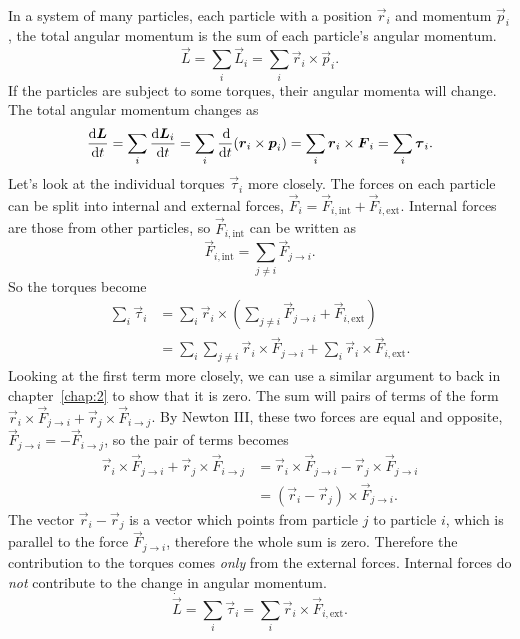 \documentclass[../classical_mechanics.tex]{subfiles}
\begin{document}
        \paragraph{}
        In a system of many particles, each particle with a position $\vec{r}_i$ and momentum $\vec{p}_i$, the total angular momentum is the sum of each particle's angular momentum.
        \begin{equation}
            \vec{L}=\sum_i\vec{L}_i=\sum_i\vec{r}_i\times\vec{p}_i.
        \end{equation}
        If the particles are subject to some torques, their angular momenta will change.
        The total angular momentum changes as
        \begin{equation}
            \dv{\vec{L}}{t}=\sum_i\dv{\vec{L}_i}{t}=\sum_i\dv{}{t}(\vec{r}_i\times\vec{p}_i)=\sum_i\vec{r}_i\times\vec{F}_i=\sum_i\vec{\tau}_i.
        \end{equation}
        Let's look at the individual torques $\vec{\tau}_i$ more closely.
        The forces on each particle can be split into internal and external forces, $\vec{F}_i=\vec{F}_{i,\text{int}}+\vec{F}_{i,\text{ext}}$.
        Internal forces are those from other particles, so $\vec{F}_{i,\text{int}}$ can be written as
        \begin{equation}
            \vec{F}_{i,\text{int}}=\sum_{j\neq i}\vec{F}_{j\to i}.
        \end{equation}
        So the torques become
        \begin{align}
            \sum_i\vec{\tau}_i&=\sum_i\vec{r}_i\times\left(\sum_{j\neq i}\vec{F}_{j\to i}+\vec{F}_{i,\text{ext}}\right)\\
            &=\sum_i\sum_{j\neq i}\vec{r}_i\times\vec{F}_{j\to i}+\sum_i\vec{r}_i\times\vec{F}_{i,\text{ext}}.
        \end{align}
        Looking at the first term more closely, we can use a similar argument to back in chapter~\ref{chap:2} to show that it is zero.
        The sum will pairs of terms of the form $\vec{r}_i\times\vec{F}_{j\to i}+\vec{r}_j\times\vec{F}_{i\to j}$.
        By Newton III, these two forces are equal and opposite, $\vec{F}_{j\to i}=-\vec{F}_{i\to j}$, so the pair of terms becomes
        \begin{align}
            \vec{r}_i\times\vec{F}_{j\to i}+\vec{r}_j\times\vec{F}_{i\to j}&=\vec{r}_i\times\vec{F}_{j\to i}-\vec{r}_j\times\vec{F}_{j\to i}\\
            &=(\vec{r}_i-\vec{r}_j)\times\vec{F}_{j\to i}.
        \end{align}
        The vector $\vec{r}_i-\vec{r}_j$ is a vector which points from particle $j$ to particle $i$, which is parallel to the force $\vec{F}_{j\to i}$, therefore the whole sum is zero.
        Therefore the contribution to the torques comes \textit{only} from the external forces.
        Internal forces do \textit{not} contribute to the change in angular momentum.
        \begin{equation}
            \dot{\vec{L}}=\sum_i\vec{\tau}_i=\sum_i\vec{r}_i\times\vec{F}_{i,\text{ext}}.
        \end{equation}
\end{document}
